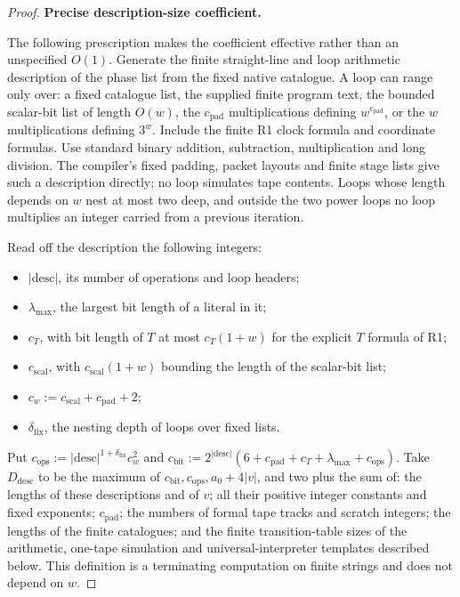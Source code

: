 \begin{proof}
\textbf{Precise description-size coefficient.}

The following prescription makes the coefficient effective rather than an unspecified \(O(1)\). Generate the finite straight-line and loop arithmetic description of the phase list from the fixed native catalogue. A loop can range only over: a fixed catalogue list, the supplied finite program text, the bounded scalar-bit list of length \(O(w)\), the \(c_{\mathrm{pad}}\) multiplications defining \(w^{c_{\mathrm{pad}}}\), or the \(w\) multiplications defining \(3^{w}\). Include the finite R1 clock formula and coordinate formulas. Use standard binary addition, subtraction, multiplication and long division. The compiler's fixed padding, packet layouts and finite stage lists give such a description directly; no loop simulates tape contents. Loops whose length depends on \(w\) nest at most two deep, and outside the two power loops no loop multiplies an integer carried from a previous iteration.

Read off the description the following integers:
\begin{itemize}
\item \(|\mathrm{desc}|\), its number of operations and loop headers;
\item \(\lambda_{\mathrm{max}}\), the largest bit length of a literal in it;
\item \(c_{T}\), with bit length of \(T\) at most \(c_{T}(1+w)\) for the explicit \(T\) formula of R1;
\item \(c_{\mathrm{scal}}\), with \(c_{\mathrm{scal}}(1+w)\) bounding the length of the scalar-bit list;
\item \(c_{w}:=c_{\mathrm{scal}}+c_{\mathrm{pad}}+2\);
\item \(\delta_{\mathrm{fix}}\), the nesting depth of loops over fixed lists.
\end{itemize}

Put \(c_{\mathrm{ops}}:=|\mathrm{desc}|^{1+\delta_{\mathrm{fix}}} c_{w}^{2}\) and \(c_{\mathrm{bit}}:=2^{|\mathrm{desc}|}(6+c_{\mathrm{pad}}+c_{T}+\lambda_{\mathrm{max}}+c_{\mathrm{ops}})\). Take \(D_{\mathrm{desc}}\) to be the maximum of \(c_{\mathrm{bit}}, c_{\mathrm{ops}}, a_{0}+4|v|\), and two plus the sum of: the lengths of these descriptions and of \(v\); all their positive integer constants and fixed exponents; \(c_{\mathrm{pad}}\); the numbers of formal tape tracks and scratch integers; the lengths of the finite catalogues; and the finite transition-table sizes of the arithmetic, one-tape simulation and universal-interpreter templates described below. This definition is a terminating computation on finite strings and does not depend on \(w\).


\end{proof}
